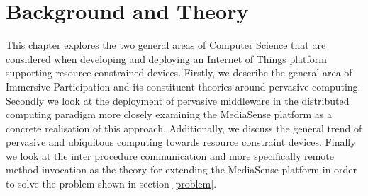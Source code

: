 \chapter{Background and Theory}
This chapter explores the two general areas of Computer Science that are considered when developing and deploying an Internet of Things platform supporting resource constrained devices. Firstly, we describe the general area of Immersive Participation and its constituent theories around pervasive computing. Secondly we look at the deployment of pervasive middleware in the distributed computing paradigm more closely examining the MediaSense platform as a concrete realisation of this approach. Additionally, we discuss the general trend of pervasive and ubiquitous computing towards resource constraint devices. Finally we look at the inter procedure communication and more specifically remote method invocation as the theory for extending the MediaSense platform in order to solve the problem shown in section \ref{problem}. 










